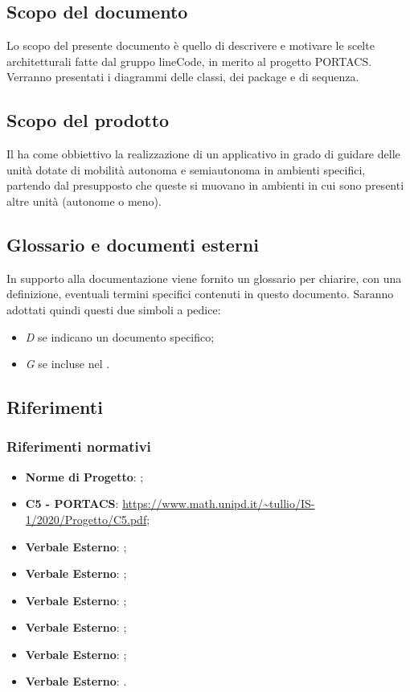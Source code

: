 \subsection{Scopo del documento}
Lo scopo del presente documento è quello di descrivere e motivare le scelte architetturali fatte dal gruppo lineCode, in merito al progetto PORTACS. Verranno presentati i diagrammi delle classi, dei package e di sequenza.

\subsection{Scopo del prodotto}
Il  ha come obbiettivo la realizzazione di un applicativo  in grado di guidare delle unità dotate di mobilità autonoma e semiautonoma in ambienti specifici, partendo dal presupposto che queste si muovano in ambienti in cui sono presenti altre unità (autonome o meno).

\subsection{Glossario e documenti esterni}
In supporto alla documentazione viene fornito un glossario per chiarire, con una definizione, eventuali termini specifici contenuti in questo documento. Saranno adottati quindi questi due simboli a pedice:
\begin{itemize}
	\item \textit{D} se indicano un documento specifico;
	\item \textit{G} se incluse nel .
\end{itemize}

\subsection{Riferimenti}
\subsubsection{Riferimenti normativi}
\begin{itemize}
	\item \textbf{Norme di Progetto}: ;
	\item \textbf{{ C5 - PORTACS}}: \url{https://www.math.unipd.it/~tullio/IS-1/2020/Progetto/C5.pdf};
	\item \textbf{Verbale Esterno}: ;
	\item \textbf{Verbale Esterno}: ;
	\item \textbf{Verbale Esterno}: ;
	\item \textbf{Verbale Esterno}: ;
	\item \textbf{Verbale Esterno}: ;
	\item \textbf{Verbale Esterno}: .
\end{itemize}
